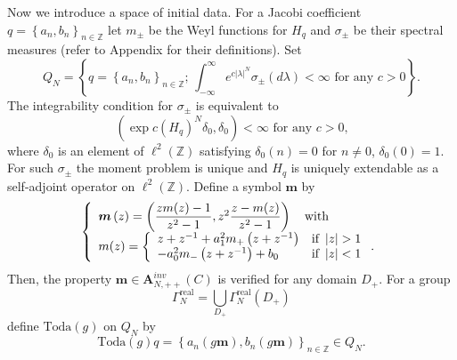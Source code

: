 \documentclass[a4paper]{article}%
\begin{document}
Now we introduce a space of initial data. For a Jacobi coefficient $q=\left\{
a_{n},b_{n}\right\}  _{n\in\mathbb{Z}}$ let $m_{\pm}$ be the Weyl functions
for $H_{q}$ and $\sigma_{\pm}$ be their spectral measures (refer to Appendix
for their definitions). Set%
\begin{equation}
Q_{N}=\left\{  q=\left\{  a_{n},b_{n}\right\}  _{n\in\mathbb{Z}}\text{;
\ }\int_{-\infty}^{\infty}e^{c\left\vert \lambda\right\vert ^{N}}\sigma_{\pm
}\left(  d\lambda\right)  <\infty\text{ for any }c>0\right\}  \text{.}
\label{1-14}%
\end{equation}
The integrability condition for $\sigma_{\pm}$ is equivalent to%
\[
\left(  \exp c\left(  H_{q}\right)  ^{N}\delta_{0},\delta_{0}\right)
<\infty\text{ \ for any }c>0\text{,}%
\]
where $\delta_{0}$ is an element of $\ell^{2}\left(  \mathbb{Z}\right)  $
satisfying $\delta_{0}\left(  n\right)  =0$ for $n\neq0$, $\delta_{0}\left(
0\right)  =1$. For such $\sigma_{\pm}$ the moment problem is unique and
$H_{q}$ is uniquely extendable as a self-adjoint operator on $\ell^{2}\left(
\mathbb{Z}\right)  $. Define a symbol $\boldsymbol{m}$ by%
\begin{equation}
\left\{
\begin{array}
[c]{l}%
\boldsymbol{m}\left(  z\right)  =\left(  \dfrac{zm(z)-1}{z^{2}-1},z^{2}%
\dfrac{z-m(z)}{z^{2}-1}\right)  \text{ \ \ with}\\
m(z)=\left\{
\begin{array}
[c]{ll}%
z+z^{-1}+a_{1}^{2}m_{+}\left(  z+z^{-1}\right)  & \text{if }\left\vert
z\right\vert >1\\
-a_{0}^{2}m_{-}\left(  z+z^{-1}\right)  +b_{0} & \text{if }\left\vert
z\right\vert <1
\end{array}
\right.  \text{.}%
\end{array}
\right.  \label{1-15}%
\end{equation}
Then, the property $\boldsymbol{m}\in\boldsymbol{A}_{N,++}^{inv}\left(
C\right)  $ is verified for any domain $D_{+}$. For a group%
\begin{equation}
\Gamma_{N}^{\operatorname{real}}=\bigcup_{D_{+}}\Gamma_{N}%
^{\operatorname{real}}\left(  D_{+}\right)  \label{1-16}%
\end{equation}
define $\mathrm{Toda}\left(  g\right)  $ on $Q_{N}$ by%
\begin{equation}
\mathrm{Toda}\left(  g\right)  q=\left\{  a_{n}\left(  g\boldsymbol{m}\right)
,b_{n}\left(  g\boldsymbol{m}\right)  \right\}  _{n\in\mathbb{Z}}\in
Q_{N}\text{.} \label{1-17}%
\end{equation}
\end{document}
